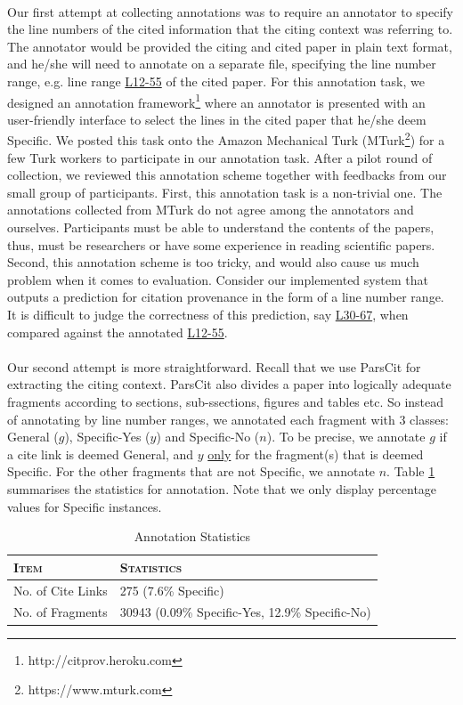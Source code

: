 \paragraph{}
Our first attempt at collecting annotations was to require an annotator to specify the line numbers of the cited information that the citing context was referring to. The annotator would be provided the citing and cited paper in plain text format, and he/she will need to annotate on a separate file, specifying the line number range, e.g. line range \url{L12-55} of the cited paper. For this annotation task, we designed an annotation framework\footnote{http://citprov.heroku.com} where an annotator is presented with an user-friendly interface to select the lines in the cited paper that he/she deem Specific. We posted this task onto the Amazon Mechanical Turk (MTurk\footnote{https://www.mturk.com}) for a few Turk workers to participate in our annotation task. After a pilot round of collection, we reviewed this annotation scheme together with feedbacks from our small group of participants. First, this annotation task is a non-trivial one. The annotations collected from MTurk do not agree among the annotators and ourselves. Participants must be able to understand the contents of the papers, thus, must be researchers or have some experience in reading scientific papers. Second, this annotation scheme is too tricky, and would also cause us much problem when it comes to evaluation. Consider our implemented system that outputs a prediction for citation provenance in the form of a line number range. It is difficult to judge the correctness of this prediction, say \url{L30-67}, when compared against the annotated \url{L12-55}.

\paragraph{}
Our second attempt is more straightforward. Recall that we use ParsCit for extracting the citing context. ParsCit also divides a paper into logically adequate fragments according to sections, sub-ssections, figures and tables etc. So instead of annotating by line number ranges, we annotated each fragment with 3 classes: General ($g$), Specific-Yes ($y$) and Specific-No ($n$). To be precise, we annotate $g$ if a cite link is deemed General, and $y$ \underline{only} for the fragment(s) that is deemed Specific. For the other fragments that are not Specific, we annotate $n$. Table \ref{tab:annotation} summarises the statistics for annotation. Note that we only display percentage values for Specific instances.
\begin{table}[h]
	\center
	\begin{tabular}{ l | l}
		\textsc{Item} & \textsc{Statistics}\\
		\hline
		No. of Cite Links & 275 (7.6\% Specific) \\
		No. of Fragments & 30943 (0.09\% Specific-Yes, 12.9\% Specific-No)
	\end{tabular}
	\caption{Annotation Statistics}
	\label{tab:annotation}
\end{table}


